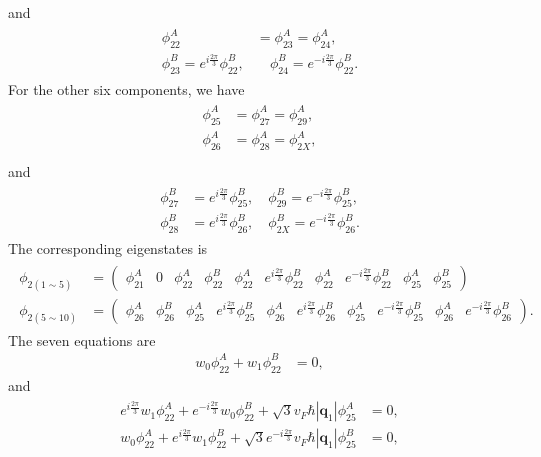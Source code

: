 \documentclass[10pt, oneside]{article}
\newcommand{\p}[1]{\left(#1\right)}
\newcommand{\bv}[1]{\left|#1\right|}
\begin{document}
and
\begin{align}
	\begin{split}
		\phi_{22}^{A} & = \phi_{23}^{A} = \phi_{24}^{A}, \\
		\phi_{23}^{B} = e^{i \frac{2 \pi}{3}} \phi_{22}^{B}, & \quad \phi_{24}^{B} = e^{- i \frac{2 \pi}{3}} \phi_{22}^{B}.
	\end{split}
\end{align}
For the other six components, we have
\begin{align}
	\begin{split}
		\phi_{25}^{A} & = \phi_{27}^{A} = \phi_{29}^{A}, \\
		\phi_{26}^{A} & = \phi_{28}^{A} = \phi_{2X}^{A}, \\
	\end{split}
\end{align}
and 
\begin{align}
	\begin{split}
		\phi_{27}^{B} & = e^{i \frac{2 \pi}{3}} \phi_{25}^{B}, \quad \phi_{29}^{B} = e^{- i \frac{2 \pi}{3}} \phi_{25}^{B}, \\
		\phi_{28}^{B} & = e^{i \frac{2 \pi}{3}} \phi_{26}^{B}, \quad \phi_{2X}^{B} = e^{- i \frac{2 \pi}{3}} \phi_{26}^{B}.
	\end{split}
\end{align}
The corresponding eigenstates is 
\begin{align}
	\begin{split}
		\phi_{2\p{1 \sim 5}} & =  \begin{pmatrix}
			\phi_{21}^{A} & 0 & \phi_{22}^{A} & \phi_{22}^{B} & \phi_{22}^{A} &  e^{i \frac{2 \pi}{3}} \phi_{22}^{B} & \phi_{22}^{A} & e^{- i \frac{2 \pi}{3}} \phi_{22}^{B} & \phi_{25}^{A} & \phi_{25}^{B}
		\end{pmatrix} \\
		\phi_{2\p{5 \sim 10}} & = \begin{pmatrix}
			\phi_{26}^{A} & \phi_{26}^{B} & \phi_{25}^{A} &  e^{i \frac{2 \pi}{3}} \phi_{25}^{B} & \phi_{26}^{A} & e^{i \frac{2 \pi}{3}} \phi_{26}^{B} & \phi_{25}^{A} & e^{- i \frac{2 \pi}{3}} \phi_{25}^{B} & \phi_{26}^{A} &  e^{- i \frac{2 \pi}{3}} \phi_{26}^{B}
		\end{pmatrix}.
	\end{split}
\end{align}
The seven equations are
\begin{align}
	w_0 \phi_{22}^{A} + w_1 \phi_{22}^{B} & = 0, 
\end{align}
and 
\begin{align}
	\begin{split}
		e^{i \frac{2 \pi}{3}} w_1 \phi_{22}^{A} + e^{-i \frac{2 \pi}{3}} w_0 \phi_{22}^B + \sqrt{3} v_F \hbar \bv{\bm{q}_1} \phi_{25}^{A} & = 0, \\
		w_0 \phi_{22}^{A} + e^{i \frac{2 \pi}{3}} w_1 \phi_{22}^{B} + \sqrt{3} e^{- i \frac{2 \pi}{3}} v_F \hbar \bv{\bm{q}_1} \phi_{25}^{B} & = 0, \\
	\end{split}
\end{align}
\end{document}
